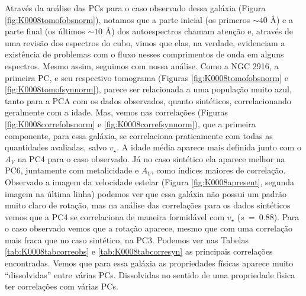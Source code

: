 Através da análise das PCs para o caso observado dessa galáxia (Figura \ref{fig:K0008tomofobsnorm}), notamos que a parte
inicial (os primeros $\sim40$ \AA) e a parte final (os últimos $\sim10$ \AA) dos autoespectros chamam atenção e, através
de uma revisão dos espectros do cubo, vimos que elas, na verdade, evidenciam a existência de problemas com o fluxo
nesses comprimentos de onda em alguns espectros. Mesmo assim, seguimos com nossa análise. Como a NGC 2916, a primeira
PC, e seu respectivo tomograma (Figuras \ref{fig:K0008tomofobsnorm} e \ref{fig:K0008tomofsynnorm}), parece ser
relacionada a uma população muito azul, tanto para a PCA com os dados observados, quanto sintéticos, correlacionando
geralmente com a idade. Mas, vemos nas correlações (Figuras \ref{fig:K0008correfobsnorm} e
\ref{fig:K0008correfsynnorm}), que a primeira componente, para essa galáxia, se correlaciona praticamente com todas as
quantidades avaliadas, salvo $v_\star$. A idade média aparece mais definida junto com o $A_V$ na PC4 para o caso
observado. Já no caso sintético ela aparece melhor na PC6, juntamente com metalicidade e $A_V$, como índices maiores de
correlação. Observado a imagem da velocidade estelar (Figura \ref{fig:K0008apresent}, segunda imagem na última linha)
podemos ver que essa galáxia não possui um padrão muito claro de rotação, mas na análise das correlações para os dados
sintéticos vemos que a PC4 se correlaciona de maneira formidável com $v_\star$ ($s\ =\ 0.88$). Para o caso observado
vemos que a rotação aparece, mesmo que com uma correlação mais fraca que no caso sintético, na PC3. Podemos ver nas
Tabelas \ref{tab:K0008tabcorreobs} e \ref{tab:K0008tabcorresyn} as principais correlações encontradas. Vemos que para
essa galáxia as propriedades físicas aparece muito ``dissolvidas'' entre várias PCs. Dissolvidas no sentido de uma
propriedade física ter correlações com várias PCs.

